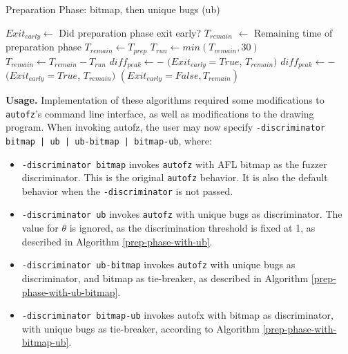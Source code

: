 \begin{algorithm}[ht!]
  \caption{Preparation Phase: bitmap, then unique bugs (ub)}\label{prep-phase-with-bitmap-ub}
  \small
  \begin{algorithmic}[1]
    \Output
      \State $Exit_{early} \gets$ Did preparation phase exit early?
      \State $T_{remain}$ $\gets$ Remaining time of preparation phase
    \EndOutput
      \State $T_{remain} \gets T_{prep}$
        \State $T_{run} \gets min(T_{remain},30)$
            \State {}
          \EndFor
        \Else {}
          \State {}
        \EndIf
        \State $T_{remain} \gets T_{remain} - T_{run}$
        \State $diff_{peak} \gets $$ - $
          \State \Return $(Exit_{early}=True$, $T_{remain})$
        \Else {}
          \State $diff_{peak} \gets $$ - $
              \State \Return $(Exit_{early}=True$, $T_{remain})$
          \EndIf
        \EndIf
      \EndWhile
      \State \Return $(Exit_{early}=False, T_{remain})$
    \EndFunction
  \end{algorithmic}
\end{algorithm}

\textbf{Usage.} Implementation of these algorithms required some modifications to \texttt{autofz}'s 
command line interface, as well as modifications to the drawing program. When invoking 
autofz, the user may now specify \texttt{\textendash-discriminator bitmap | ub | ub-bitmap | bitmap-ub},
where:

\begin{itemize}
  \item \texttt{\textendash-discriminator bitmap} invokes \texttt{autofz} with AFL bitmap as the 
  fuzzer discriminator. This is the original \texttt{autofz} behavior. It is also the default behavior 
  when the \texttt{\textendash-discriminator} is not passed.
  \item \texttt{\textendash-discriminator ub} invokes \texttt{autofz} with unique bugs as discriminator. The 
  value for $\theta$ is ignored, as the discrimination threshold is fixed at 1, as described 
  in Algorithm \ref{prep-phase-with-ub}.
  \item \texttt{\textendash-discriminator ub-bitmap} invokes \texttt{autofz} with unique bugs as discriminator, 
  and bitmap as tie-breaker, as described in Algorithm \ref{prep-phase-with-ub-bitmap}.
  \item \texttt{\textendash-discriminator bitmap-ub} invokes autofx with bitmap as discriminator, 
  with unique bugs as tie-breaker, according to Algorithm \ref{prep-phase-with-bitmap-ub}.
\end{itemize}

